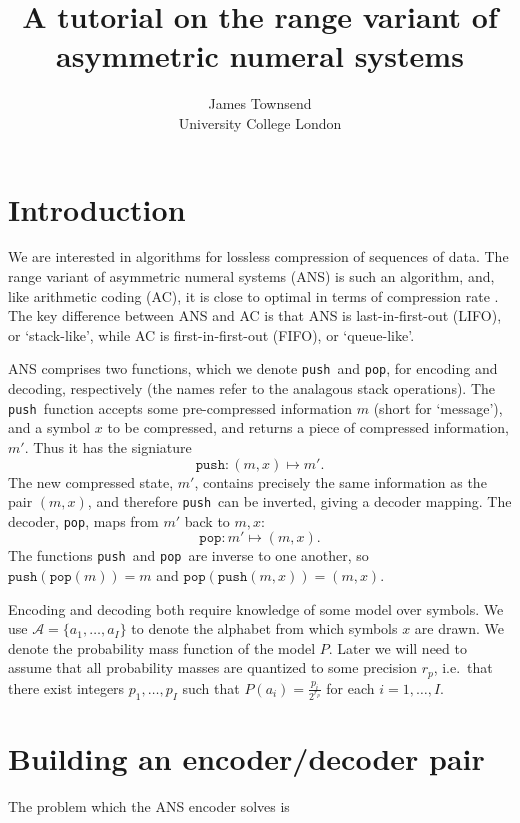 \documentclass{article}
\author{
  James Townsend\\
  University College London
}
\title{A tutorial on the range variant of asymmetric numeral systems}
\newcommand{\push}{\texttt{push}}
\newcommand{\pop}{\texttt{pop}}
\begin{document}
\maketitle
\section{Introduction}
We are interested in algorithms for lossless compression of sequences of data.
The range variant of asymmetric numeral systems (ANS) is such an algorithm,
and, like arithmetic coding (AC), it is close to optimal in terms of
compression rate \citep{dudaAsymmetricNumeralSystems2009}. The key difference
between ANS and AC is that ANS is last-in-first-out (LIFO), or `stack-like',
while AC is first-in-first-out (FIFO), or `queue-like'.

ANS comprises two functions, which we denote \push\ and \pop, for encoding and
decoding, respectively (the names refer to the analagous stack operations). The
\push\ function accepts some pre-compressed information $m$ (short for
`message'), and a symbol $x$ to be compressed, and returns a piece of
compressed information, $m'$. Thus it has the signiature
\begin{equation}
  \push:(m, x) \mapsto m'.
\end{equation}
The new compressed state, $m'$, contains precisely the same information as the
pair $(m, x)$, and therefore \push\ can be inverted, giving a decoder mapping.
The decoder, \pop, maps from $m'$ back to $m, x$:
\begin{equation}
  \pop:m' \mapsto (m, x).
\end{equation}
The functions \push\ and \pop\ are inverse to one another, so
$\push(\pop(m))=m$ and $\pop(\push(m, x)) = (m, x)$.

Encoding and decoding both require knowledge of some model over symbols. We use
$\mathcal{A} = \{a_1, \ldots, a_I\}$ to denote the alphabet from which symbols
$x$ are drawn. We denote the probability mass function of the model $P$. Later
we will need to assume that all probability masses are quantized to some
precision $r_p$, i.e.\ that there exist integers $p_1, \ldots, p_I$ such that
$P(a_i) = \frac{p_i}{2^{r_p}}$ for each $i = 1,\ldots,I$.

\section{Building an encoder/decoder pair}
The problem which the ANS encoder solves is
\end{document}
